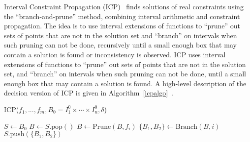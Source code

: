 \documentclass{llncs}
\begin{document}
Interval Constraint Propagation (ICP)~\cite{handbookICP} finds
solutions of real constraints using the ``branch-and-prune'' method, combining
interval arithmetic and constraint propagation. The idea is to use interval
extensions of functions to ``prune'' out sets of points that are not in the
solution set and ``branch'' on intervals when
such pruning can not be done, recursively until a small enough box
that may contain a solution is found or inconsistency is observed. ICP uses interval extensions of functions to ``prune'' out sets of points that are not in the solution set, and ``branch'' on intervals when such pruning can not be done, until a small enough box that may contain a solution is found. A high-level description of the decision version of ICP is given in Algorithm~\ref{icpalgo}~\cite{handbookICP,DBLP:conf/cade/GaoAC12}.  
\begin{algorithm}\label{algo1}
\caption{ICP($f_1,...,f_m, B_0 = I_1^0\times\cdots\times I_n^0, \delta$)}\label{icpalgo}
\begin{algorithmic}[1]
\Statex
    \State $S \gets B_0$
        \State $B \gets S.\mathrm{pop}()$
        \State $B \gets \mathrm{Prune}(B, f_i)$
        \EndWhile
                \State $\{B_1,B_2\} \gets \mathrm{Branch}(B, i)$
                \State $S.\mathrm{push}(\{B_1,B_2\})$
            \Else
                \State {}
            \EndIf
        \EndIf
    \EndWhile
    \State {}
\end{algorithmic}
\end{algorithm}
\end{document}
